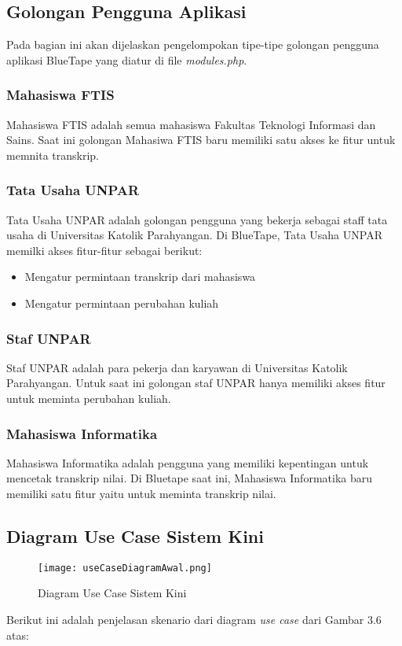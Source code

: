 \subsection{Golongan Pengguna Aplikasi}
Pada bagian ini akan dijelaskan pengelompokan tipe-tipe golongan pengguna aplikasi BlueTape yang diatur di file \textit{modules.php}.

\subsubsection{Mahasiswa FTIS}
Mahasiswa FTIS adalah semua mahasiswa Fakultas Teknologi Informasi dan Sains. Saat ini golongan Mahasiwa FTIS baru memiliki satu akses ke fitur untuk memnita transkrip.

\subsubsection{Tata Usaha UNPAR}
Tata Usaha UNPAR adalah golongan pengguna yang bekerja sebagai staff tata usaha di Universitas Katolik Parahyangan. Di BlueTape, Tata Usaha UNPAR memilki akses fitur-fitur sebagai berikut:
\begin{itemize}
	\item Mengatur permintaan transkrip dari mahasiswa
	\item Mengatur permintaan perubahan kuliah 
\end{itemize}

\subsubsection{Staf UNPAR}
Staf UNPAR adalah para pekerja dan karyawan di Universitas Katolik Parahyangan. Untuk saat ini golongan staf UNPAR hanya memiliki akses fitur untuk meminta perubahan kuliah.

\subsubsection{Mahasiswa Informatika}
Mahasiswa Informatika adalah pengguna yang memiliki kepentingan untuk mencetak transkrip nilai. Di Bluetape saat ini, Mahasiswa Informatika baru memiliki satu fitur yaitu untuk meminta transkrip nilai.


\subsection{Diagram Use Case Sistem Kini}
\begin{figure} [H]
	\centering  
	\texttt{[image: useCaseDiagramAwal.png]}
	\caption[Diagram Use Case Sistem Kini]{Diagram Use Case Sistem Kini} 
	\label{fig:flow-chart-CodeIgniter} 
\end{figure}
Berikut ini adalah penjelasan skenario dari diagram \textit{use case} dari Gambar 3.6 atas:

